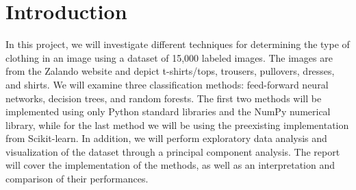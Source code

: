 \section{Introduction}
In this project, we will investigate different techniques for determining the type of clothing in an image using a dataset of 15,000 labeled images.
The images are from the Zalando website and depict t-shirts/tops, trousers, pullovers, dresses, and shirts.
We will examine three classification methods: feed-forward neural networks, decision trees, and random forests.
The first two methods will be implemented using only Python standard libraries and the NumPy numerical library, while for the last method we will be using the preexisting implementation from Scikit-learn.
In addition, we will perform exploratory data analysis and visualization of the dataset through a principal component analysis.
The report will cover the implementation of the methods, as well as an interpretation and comparison of their performances.